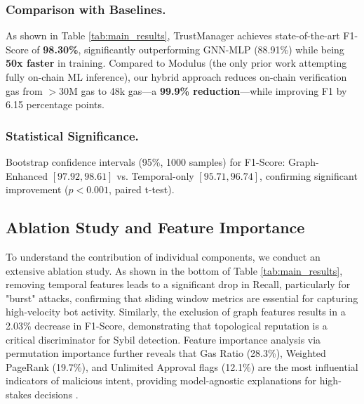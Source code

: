 \documentclass[runningheads]{llncs}
\begin{document}
\subsubsection{Comparison with Baselines.}
As shown in Table \ref{tab:main_results}, TrustManager achieves state-of-the-art F1-Score of \textbf{98.30\%}, significantly outperforming GNN-MLP (88.91\%) while being \textbf{50x faster} in training. Compared to Modulus \cite{modulus2023cost} (the only prior work attempting fully on-chain ML inference), our hybrid approach reduces on-chain verification gas from $>30$M gas to 48k gas—a \textbf{99.9\% reduction}—while improving F1 by 6.15 percentage points.

\subsubsection{Statistical Significance.}
Bootstrap confidence intervals (95\%, 1000 samples) for F1-Score: Graph-Enhanced $[97.92, 98.61]$ vs. Temporal-only $[95.71, 96.74]$, confirming significant improvement ($p < 0.001$, paired t-test).

\subsection{Ablation Study and Feature Importance}
To understand the contribution of individual components, we conduct an extensive ablation study. As shown in the bottom of Table \ref{tab:main_results}, removing temporal features leads to a significant drop in Recall, particularly for "burst" attacks, confirming that sliding window metrics are essential for capturing high-velocity bot activity. Similarly, the exclusion of graph features results in a 2.03\% decrease in F1-Score, demonstrating that topological reputation is a critical discriminator for Sybil detection. Feature importance analysis via permutation importance further reveals that Gas Ratio (28.3\%), Weighted PageRank (19.7\%), and Unlimited Approval flags (12.1\%) are the most influential indicators of malicious intent, providing model-agnostic explanations for high-stakes decisions \cite{aas2021explaining}.
\end{document}
